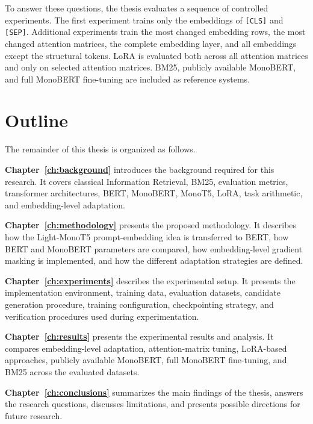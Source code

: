 To answer these questions, the thesis evaluates a sequence of controlled experiments. The first experiment trains only the embeddings of \texttt{[CLS]} and \texttt{[SEP]}. Additional experiments train the most changed embedding rows, the most changed attention matrices, the complete embedding layer, and all embeddings except the structural tokens. LoRA is evaluated both across all attention matrices and only on selected attention matrices. BM25, publicly available MonoBERT, and full MonoBERT fine-tuning are included as reference systems.

\section{Outline}
\label{sec:introduction_outline}

The remainder of this thesis is organized as follows.

\vspace{\baselineskip}

\textbf{Chapter~\ref{ch:background}} introduces the background required for this research. It covers classical Information Retrieval, BM25, evaluation metrics, transformer architectures, BERT, MonoBERT, MonoT5, LoRA, task arithmetic, and embedding-level adaptation.

\vspace{\baselineskip}

\textbf{Chapter~\ref{ch:methodology}} presents the proposed methodology. It describes how the Light-MonoT5 prompt-embedding idea is transferred to BERT, how BERT and MonoBERT parameters are compared, how embedding-level gradient masking is implemented, and how the different adaptation strategies are defined.

\vspace{\baselineskip}

\textbf{Chapter~\ref{ch:experiments}} describes the experimental setup. It presents the implementation environment, training data, evaluation datasets, candidate generation procedure, training configuration, checkpointing strategy, and verification procedures used during experimentation.

\vspace{\baselineskip}

\textbf{Chapter~\ref{ch:results}} presents the experimental results and analysis. It compares embedding-level adaptation, attention-matrix tuning, LoRA-based approaches, publicly available MonoBERT, full MonoBERT fine-tuning, and BM25 across the evaluated datasets.

\vspace{\baselineskip}

\textbf{Chapter~\ref{ch:conclusions}} summarizes the main findings of the thesis, answers the research questions, discusses limitations, and presents possible directions for future research.